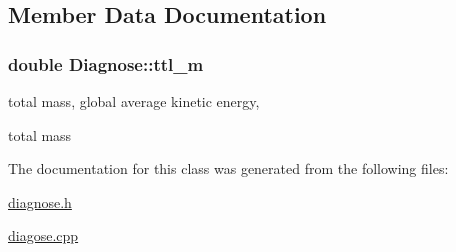 \subsection{Member Data Documentation}
\hypertarget{classDiagnose_31e87c9b084b73a78c1e2758149800ed}{
\subsubsection[{ttl\_\-m}]{\setlength{\rightskip}{0pt plus 5cm}double {\bf Diagnose::ttl\_\-m}}}
\label{classDiagnose_31e87c9b084b73a78c1e2758149800ed}


total mass, global average kinetic energy, 

total mass 

The documentation for this class was generated from the following files:\begin{CompactItemize}
\item 
\hyperlink{diagnose_8h}{diagnose.h}\item 
\hyperlink{diagose_8cpp}{diagose.cpp}\end{CompactItemize}
